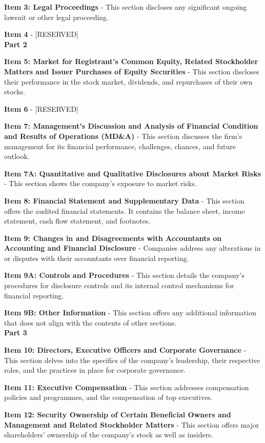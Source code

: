 \documentclass[logo,bsc,singlespacing,parskip]{infthesis}
\begin{document}
\textbf{Item 3: Legal Proceedings} - This section discloses any significant ongoing lawsuit or other legal proceeding. 

\textbf{Item 4} - [RESERVED] \\


\textbf{Part 2} 


\textbf{Item 5: Market for Registrant’s Common Equity, Related Stockholder Matters and Issuer Purchases of Equity Securities} - This section discloses their performance in the stock market, dividends, and repurchases of their own stocks. 

\textbf{Item 6} - [RESERVED]

\textbf{Item 7: Management’s Discussion and Analysis of Financial Condition and Results of Operations (MD&A)} - This section discusses the firm’s management for its financial performance, challenges, chances, and future outlook.

\textbf{Item 7A: Quantitative and Qualitative Disclosures about Market Risks} - This section shows the company’s exposure to market risks.

\textbf{Item 8: Financial Statement and Supplementary Data} - This section offers the audited financial statements. It contains the balance sheet, income statement, cash flow statement, and footnotes. 

\textbf{Item 9: Changes in and Disagreements with Accountants on Accounting and Financial Disclosure} - Companies address any alterations in or disputes with their accountants over financial reporting.

\textbf{Item 9A: Controls and Procedures} - This section details the company’s procedures for disclosure controls and its internal control mechanisms for financial reporting. 

\textbf{Item 9B: Other Information} - This section offers any additional information that does not align with the contents of other sections. \\


\textbf{Part 3} 


\textbf{Item 10: Directors, Executive Officers and Corporate Governance} - This section delves into the specifics of the company’s leadership, their respective roles, and the practices in place for corporate governance.

\textbf{Item 11: Executive Compensation} - This section addresses compensation policies and programmes, and the compensation of top executives. 

\textbf{Item 12: Security Ownership of Certain Beneficial Owners and Management and Related Stockholder Matters} - This section offers major shareholders’ ownership of the company’s stock as well as insiders.
\end{document}

